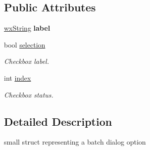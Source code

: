 \subsection*{Public Attributes}
\begin{DoxyCompactItemize}
\item 
\hypertarget{structBatchOption_a6a940d6c48fe05f9e2644f7fae620ead}{
\hyperlink{classwxString}{wxString} {\bfseries label}}
\label{structBatchOption_a6a940d6c48fe05f9e2644f7fae620ead}

\item 
\hypertarget{structBatchOption_a10bc2219640a36fb958d12a04e6aa788}{
bool \hyperlink{structBatchOption_a10bc2219640a36fb958d12a04e6aa788}{selection}}
\label{structBatchOption_a10bc2219640a36fb958d12a04e6aa788}

\begin{DoxyCompactList}\small\item\em Checkbox label. \item\end{DoxyCompactList}\item 
\hypertarget{structBatchOption_ad2ed1257616372c9ea259eab2476b4b1}{
int \hyperlink{structBatchOption_ad2ed1257616372c9ea259eab2476b4b1}{index}}
\label{structBatchOption_ad2ed1257616372c9ea259eab2476b4b1}

\begin{DoxyCompactList}\small\item\em Checkbox status. \item\end{DoxyCompactList}\end{DoxyCompactItemize}


\subsection{Detailed Description}
small struct representing a batch dialog option 

